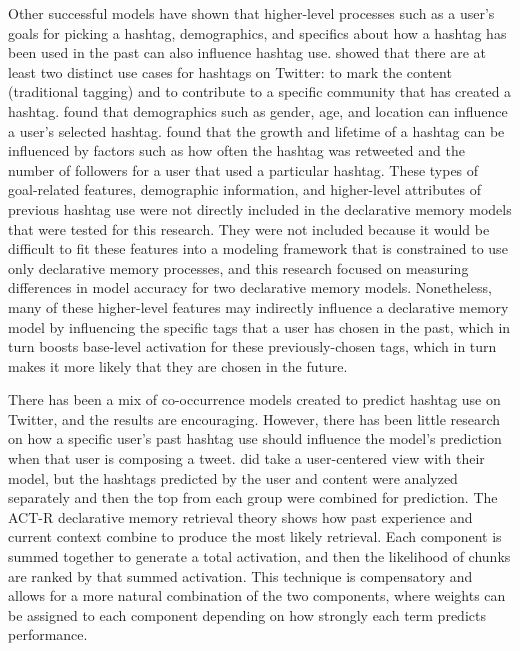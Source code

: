 \documentclass[man,floatsintext,donotrepeattitle]{apa6}
\begin{document}
Other successful models have shown that higher-level processes such as a user's goals for picking a hashtag, demographics, and specifics about how a hashtag has been used in the past can also influence hashtag use.
\textcite{lin2013bigbirds} showed that there are at least two distinct use cases for hashtags on Twitter: to mark the content (traditional tagging) and to contribute to a specific community that has created a hashtag.
\textcite{yang2012we} found that demographics such as gender, age, and location can influence a user's selected hashtag.
\textcite{denton2015user} found that the growth and lifetime of a hashtag can be influenced by factors such as how often the hashtag was retweeted and the number of followers for a user that used a particular hashtag.
These types of goal-related features, demographic information, and higher-level attributes of previous hashtag use were not directly included in the declarative memory models that were tested for this research.
They were not included because it would be difficult to fit these features into a modeling framework that is constrained to use only declarative memory processes,
and this research focused on measuring differences in model accuracy for two declarative memory models.
Nonetheless, many of these higher-level features may indirectly influence a declarative memory model by influencing the specific tags that a user has chosen in the past,
which in turn boosts base-level activation for these previously-chosen tags, which in turn makes it more likely that they are chosen in the future.

There has been a mix of co-occurrence models created to predict hashtag use on Twitter, and the results are encouraging.
However, there has been little research on how a specific user's past hashtag use should influence the model's prediction when that user is composing a tweet.
\textcite{Kywe2012} did take a user-centered view with their model, but the hashtags predicted by the user and content were analyzed separately and then the top from each group were combined for prediction.
The ACT-R declarative memory retrieval theory shows how past experience and current context combine to produce the most likely retrieval.
Each component is summed together to generate a total activation, and then the likelihood of chunks are ranked by that summed activation.
This technique is compensatory and allows for a more natural combination of the two components, where weights can be assigned to each component depending on how strongly each term predicts performance.
\end{document}
